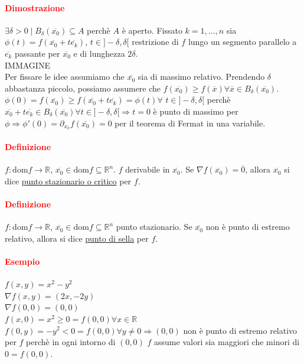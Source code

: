 \documentclass{article}
\newcommand{\R}{\mathbb{R}}
\newcommand{\dom}{\text{dom}}
\begin{document}
\paragraph{\textcolor{red}{Dimostrazione}}
$\exists \delta >0 \mid B_\delta (\overline{x_0})\subseteq A$ perchè $A$ è aperto. Fissato $k=1,...,n$ sia $\phi(t)=f(\overline{x_0}+t\overline{e_k})$, $ t \in ]-\delta,\delta[$ restrizione di $f$ lungo un segmento parallelo  a $\overline{e_k}$ passante per $\overline{x_0}$ e di lunghezza $2\delta$.\\
IMMAGINE\\
Per fissare le idee assumiamo che $\overline{x_0}$ sia di massimo relativo. Prendendo $\delta$ abbastanza piccolo, possiamo assumere che $f(\overline{x_0})\geq f(\overline{x})\forall \overline{x} \in B_\delta (\overline{x_0})$.\\
$\phi(0)=f(\overline{x_0})\geq f(\overline{x_0}+t\overline{e_k})=\phi(t)\forall \,\, t \in ]-\delta,\delta[$ perchè $\overline{x_0}+t \overline{e_k} \in B_\delta (\overline{x_0})\forall t \in ]-\delta,\delta[ \Rightarrow t=0$ è punto di massimo per $\phi \Rightarrow \phi'(0)=\partial_{x_k}f(\overline{x_0})=0$ per il teorema di Fermat in una variabile.
\begin{flushright}
    \Lightning
\end{flushright}

\paragraph{\textcolor{red}{Definizione}}
$f:\dom f \rightarrow \R$, $\overline{x_0}\in \dom f \subseteq \R^n$. $f$ derivabile in $\overline{x_0}$. Se $\nabla f(\overline{x_0})=\overline{0}$, allora $\overline{x_0}$ si dice \underline{punto stazionario o critico} per $f$.

\paragraph{\textcolor{red}{Definizione}}
$f: \dom f \rightarrow \R$, $ \overline{x_0}\in \dom f \subseteq \R^n$ punto stazionario. Se $\overline{x_0}$ non è punto di estremo relativo, allora si dice \underline{punto di sella} per $f$.

\paragraph{\textcolor{red}{Esempio}}
$f(x,y)=x^2-y^2$\\
$\nabla f(x,y)=(2x,-2y)$\\
$\nabla f(0,0)=(0,0)$\\
$f(x,0)=x^2\geq 0=f(0,0) \forall x \in \R$\\
$f(0,y)=-y^2 < 0 =f(0,0)\forall y \neq 0 \Rightarrow (0,0)$ non è punto di estremo relativo per $f$ perchè in ogni intorno di $(0,0)$ $f$ assume valori sia maggiori che minori di $0=f(0,0)$.
\end{document}
